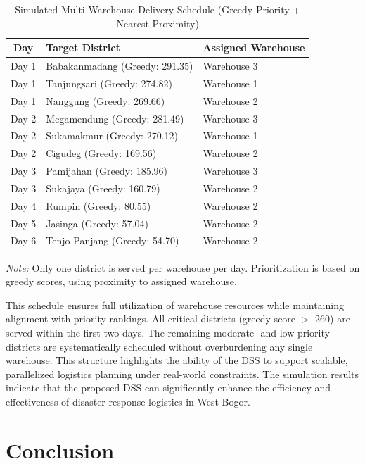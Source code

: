 \documentclass[journal,final,a4paper,twoside,11pt]{IEEEtran}
\begin{document}
\begin{table}[H]
\caption{Simulated Multi-Warehouse Delivery Schedule (Greedy Priority + Nearest Proximity)}
\begin{center}
\begin{tabular}{|c|p{4cm}|p{}|}
\hline
\textbf{Day} & \textbf{Target District} & \textbf{Assigned Warehouse} \\
\hline
Day 1 & Babakanmadang (Greedy: 291.35) & Warehouse 3 \\
\hline
Day 1 & Tanjungsari (Greedy: 274.82) & Warehouse 1 \\
\hline
Day 1 & Nanggung (Greedy: 269.66) & Warehouse 2 \\
\hline
Day 2 & Megamendung (Greedy: 281.49) & Warehouse 3 \\
\hline
Day 2 & Sukamakmur (Greedy: 270.12) & Warehouse 1 \\
\hline
Day 2 & Cigudeg (Greedy: 169.56) & Warehouse 2 \\
\hline
Day 3 & Pamijahan (Greedy: 185.96) & Warehouse 3 \\
\hline
Day 3 & Sukajaya (Greedy: 160.79) & Warehouse 2 \\
\hline
Day 4 & Rumpin (Greedy: 80.55) & Warehouse 2 \\
\hline
Day 5 & Jasinga (Greedy: 57.04) & Warehouse 2 \\
\hline
Day 6 & Tenjo Panjang (Greedy: 54.70) & Warehouse 2 \\
\hline
\end{tabular}
\label{tab:distribution_schedule}
\end{center}
\footnotesize{\textit{Note:} Only one district is served per warehouse per day. Prioritization is based on greedy scores, using proximity to assigned warehouse.}
\end{table}

This schedule ensures full utilization of warehouse resources while maintaining alignment with priority rankings. All critical districts (greedy score $>$ 260) are served within the first two days. The remaining moderate- and low-priority districts are systematically scheduled without overburdening any single warehouse. This structure highlights the ability of the DSS to support scalable, parallelized logistics planning under real-world constraints.
The simulation results indicate that the proposed DSS can significantly enhance the efficiency and effectiveness of disaster response logistics in West Bogor. 

\section{Conclusion}
\end{document}
